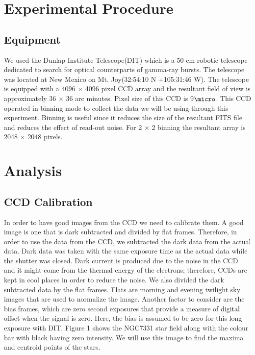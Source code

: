 \documentclass[letterpaper,12pt]{article}
\begin{document}
\section{Experimental Procedure}
\label{sec:experimental procedure}
\subsection{Equipment}
We used the Dunlap Institute Telescope(DIT) which is a 50-cm robotic telescope dedicated to search for optical counterparts of gamma-ray bursts. The telescope was located at New Mexico on Mt. Joy(32:54:10 N +105:31:46 W).  The telescope is equipped with a 4096 \begin{math}\times\end{math} 4096 pixel CCD array and the resultant field of view is approximately 36 \begin{math}\times\end{math} 36 arc minutes. Pixel size of this CCD is 9\begin{math}\micro\end{math}. This CCD operated in binning mode to collect the data we will be using through this experiment. Binning is useful since it reduces the size of the resultant FITS file and reduces the effect of read-out noise. For 2 \begin{math}\times\end{math} 2 binning the resultant array is 2048 \begin{math}\times\end{math} 2048 pixels.



\section{Analysis}
\label{analysis}
\subsection{CCD Calibration}
In order to have good images from the CCD we need to calibrate them. A good image is one that is dark subtracted and divided by flat frames. Therefore, in order to use the data from the CCD, we subtracted the dark data from the actual data. Dark data was taken with the same exposure time as the actual data while  the shutter was closed. Dark current is produced due to the noise in the CCD and it might come from the thermal energy of the electrons; therefore, CCDs are kept in cool places in order to reduce the noise. We also divided the dark subtracted data by the flat frames. Flats are morning and evening twilight sky images that are used to normalize the image. Another factor to consider are the bias frames, which are zero second exposures that provide a measure of digital offset when the signal is zero. Here, the bias is assumed to be zero for this long exposure with DIT. Figure 1 shows the NGC7331 star field along with the colour bar with black having zero intensity. We will use this image to find the maxima and centroid points of the stars.
\end{document}
